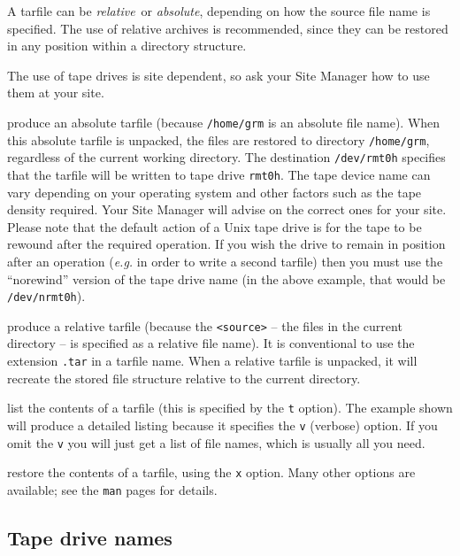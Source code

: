 A tarfile can be {\em relative}\ or {\em absolute}, depending on how the
source file name is specified.
The use of relative archives is recommended, since they can be restored in
any position within a directory structure.

The use of tape drives is site dependent, so ask your Site Manager how
to use them at your site.

\goodbreak

\exbegin

{produce an absolute tarfile (because {\tt /home/grm} is an absolute file name).
When this absolute tarfile is unpacked, the files are restored to directory
{\tt /home/grm}, regardless of the current working directory.
The destination {\tt /dev/rmt0h} specifies that the tarfile will be written to
tape drive {\tt rmt0h}. The tape device name can vary depending on your 
operating system and other factors such as the tape density required.  
Your Site Manager will advise on the correct ones for your site.
Please note that the default action of a Unix tape drive is for the
tape to be rewound after the required operation. If you wish the drive to
remain in position after an operation ({\em e.g.}\/  in order to write a second
tarfile) then you must use the ``norewind'' version of the tape drive name
(in the above example, that would be {\tt /dev/nrmt0h}).}

{produce a relative tarfile (because the {\tt <source>} -- the files in the
current directory -- is specified as a relative file name).
It is conventional to use the extension {\tt .tar} in a tarfile name.
When a relative tarfile is unpacked, it will recreate the stored file
structure relative to the current directory.}

{list the contents of a tarfile (this is specified by the {\tt t} option).
The example shown will produce a detailed listing because it specifies the
{\tt v} (verbose) option.
If you omit the {\tt v} you will just get a list of file names, which is
usually all you need.}

{restore the contents of a tarfile, using the {\tt x} option.
Many other options are available; see the {\tt man} pages for details.}

\exend

\subsection{Tape drive names\label{TapeNames}}


